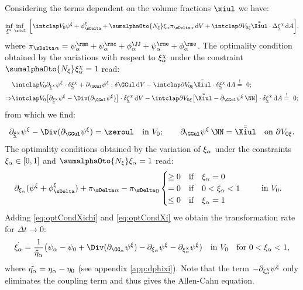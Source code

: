   Considering the terms dependent on the volume fractions $\xiul$ we have:
  \begin{align}
    \inf_{\xichiul}\inf_{\xiul} \ \bigg[ \intVO  \psixi + \phixiDelta + \sumalphaOto{\Nxi} \xia\piDeltaa \dV + \intdVOx{\xi} \bar{\tilde\Xiul}\cdot \Delta\xichiul \dA \bigg],
    \label{eq:optxi}
  \end{align}
  where $\piDeltaa = \psima + \psica + \phiJJa + \psiea + \phiea$. The optimality condition obtained by the variations with respect to $\xi^{\chi}_{\alpha}$ under the constraint $\sumalphaOto{\Nxi}\xichia=1$ read:
  \begin{align}
    \begin{aligned}
    & \intVO\dxichiul\psixi\cdot\delta\xichiul+\dGGul\psixi : \delta\GGul \dV - \intdVOx{\xi} \bar{\tilde\Xiul}\cdot \delta\xichiul \dA  \stackrel{!}{=} \ 0;  \\
    \Rightarrow & \intVO \big[\dxichiul\psixi - \Div(\dGGul\psixi)\big]\cdot\delta\xichiul \dV - \intdVOx{\xi} \big[ \bar{\tilde\Xiul} - \dGGul\psixi \, \NN \big] \cdot \delta\xichiul \dA  \stackrel{!}{=} \ 0;
    \end{aligned}
  \end{align}
  from which we find:
  \begin{align}
    \dxichiul\psixi - \Div(\dGGul\psixi) = \zeroul \quad \text{in } V_0; \qquad \dGGul\psixi\,\NN=\bar\Xiultilde \quad \text{on } \partial V_{0\xi} .
    \label{eq:optCondXichi}
  \end{align}
  The optimality conditions obtained by the variation of $\xi_\alpha$ under the constraints $\xi_\alpha \in [0,1]$ and $\sumalphaOto{\Nxi}\xia=1$ read:
  \begin{align}
    & \dxia(\psixi+\phixiDelta)+\piDeltaa-{\piDelta}_{0} \begin{cases} \geq 0 \quad \text{if} \quad \xia = 0  \\ = 0 \quad \text{if} \quad 0<\xia<1 \\ \leq 0 \quad \text{if} \quad  \xia = 1 \end{cases} \quad \text{ in } V_0.
    \label{eq:optCondXi}
  \end{align}
  Adding \cref{eq:optCondXichi} and \cref{eq:optCondXi} we obtain the transformation rate for $\Delta t \rightarrow 0$:
  \begin{align}
    \dot \xia = \frac{1}{\etaatilde} \big( \psi_\alpha-\psi_0 + \Div(\dGGa\psixi) - \dxia\psixi - \dxichia\psixi) \quad \text{in } V_0 \quad \text{for } 0<\xia<1,
  \end{align} 
  where $\tilde{\eta_{\alpha}}=\eta_{\alpha}-\eta_0$ (see appendix \ref{app:dphixi}). Note that the term $-\partial_{\xi^{\chi}_{\alpha}}\psi^{\xi}$ only eliminates the coupling term and thus gives the Allen-Cahn equation. 


